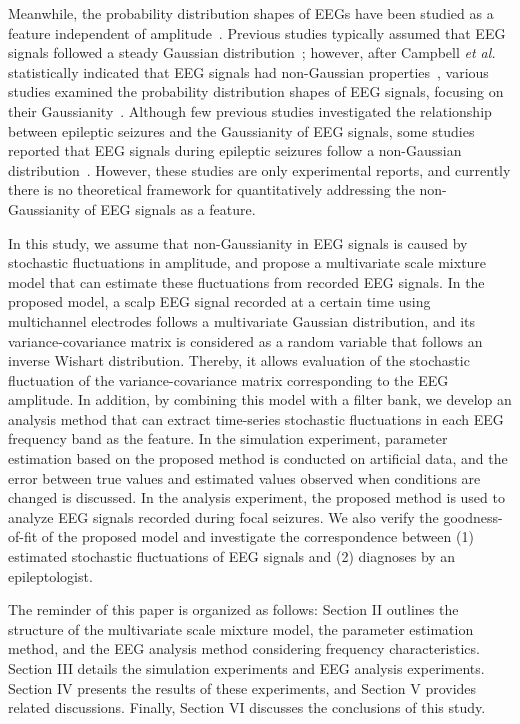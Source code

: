 \documentclass[journal]{IEEEtran}
\begin{document}
Meanwhile, the probability distribution shapes of EEGs have been studied as a feature independent of amplitude~\cite{Saunders1963,Gonen2012,Campbell1967,Weiss1973,Nurujjaman2009,Charles1999}.
Previous studies typically assumed that EEG signals followed a steady Gaussian distribution~\cite{Saunders1963,Gonen2012}; however, after Campbell \textit{et al.} statistically indicated that EEG signals had non-Gaussian properties~\cite{Campbell1967}, various studies examined the probability distribution shapes of EEG signals, focusing on their Gaussianity~\cite{Gonen2012,Weiss1973,Nurujjaman2009,Charles1999}.
Although few previous studies investigated  the relationship between epileptic seizures and the Gaussianity of EEG signals, some studies reported that EEG signals during epileptic seizures follow a non-Gaussian distribution~\cite{Nurujjaman2009,Charles1999}.
However, these studies are only experimental reports, and currently there is no theoretical framework for quantitatively addressing the non-Gaussianity of EEG signals as a feature.

In this study, we assume that non-Gaussianity in EEG signals is caused by stochastic fluctuations in amplitude, and propose a multivariate scale mixture model that can estimate these fluctuations from recorded EEG signals.
In the proposed model, a scalp EEG signal recorded at a certain time using multichannel electrodes follows a multivariate Gaussian distribution, and its variance-covariance matrix is considered as a random variable that follows an inverse Wishart distribution.
Thereby, it allows evaluation of the stochastic fluctuation of the variance-covariance matrix corresponding to the EEG amplitude.
In addition, by combining this model with a filter bank, we develop an analysis method that can extract time-series stochastic fluctuations in each EEG frequency band as the feature.
In the simulation experiment, parameter estimation based on the proposed method is conducted on artificial data, and the error between true values and estimated values observed when conditions are changed is discussed.
In the analysis experiment, the proposed method is used to analyze EEG signals recorded during focal seizures.
We also verify the goodness-of-fit of the proposed model and investigate the correspondence between (1) estimated stochastic fluctuations of EEG signals and (2) diagnoses by an epileptologist.

The reminder of this paper is organized as follows: Section II outlines the structure of the multivariate scale mixture model, the parameter estimation method, and the EEG analysis method considering frequency characteristics. Section III details the simulation experiments and EEG analysis experiments.
Section IV presents the results of these experiments, and Section V provides related discussions. Finally, Section VI discusses the conclusions of this study.
\end{document}
